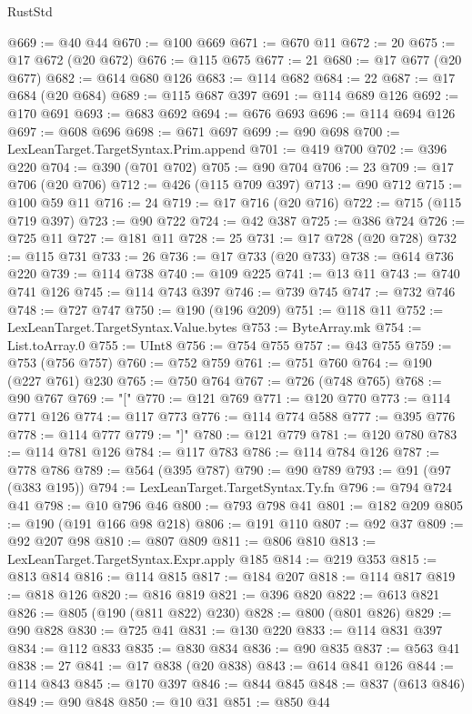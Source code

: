 \begin{lexlean}{RustStd}
\begin{coremodule}
{\begin{coremodule}
{{{{{{{{{{{{{{{{{{{{{{{{{{{{{{{{{{{{{{{{{{{{{{{{{{@669 := @40 @44
@670 := @100 @669
@671 := @670 @11
@672 := 20
@675 := @17 @672 (@20 @672)
@676 := @115 @675
@677 := 21
@680 := @17 @677 (@20 @677)
@682 := @614 @680 @126
@683 := @114 @682
@684 := 22
@687 := @17 @684 (@20 @684)
@689 := @115 @687 @397
@691 := @114 @689 @126
@692 := @170 @691
@693 := @683 @692
@694 := @676 @693
@696 := @114 @694 @126
@697 := @608 @696
@698 := @671 @697
@699 := @90 @698
@700 := LexLeanTarget.TargetSyntax.Prim.append
@701 := @419 @700
@702 := @396 @220
@704 := @390 (@701 @702)
@705 := @90 @704
@706 := 23
@709 := @17 @706 (@20 @706)
@712 := @426 (@115 @709 @397)
@713 := @90 @712
@715 := @100 @59 @11
@716 := 24
@719 := @17 @716 (@20 @716)
@722 := @715 (@115 @719 @397)
@723 := @90 @722
@724 := @42 @387
@725 := @386 @724
@726 := @725 @11
@727 := @181 @11
@728 := 25
@731 := @17 @728 (@20 @728)
@732 := @115 @731
@733 := 26
@736 := @17 @733 (@20 @733)
@738 := @614 @736 @220
@739 := @114 @738
@740 := @109 @225
@741 := @13 @11
@743 := @740 @741 @126
@745 := @114 @743 @397
@746 := @739 @745
@747 := @732 @746
@748 := @727 @747
@750 := @190 (@196 @209)
@751 := @118 @11
@752 := LexLeanTarget.TargetSyntax.Value.bytes
@753 := ByteArray.mk
@754 := List.toArray.{0}
@755 := UInt8
@756 := @754 @755
@757 := @43 @755
@759 := @753 (@756 @757)
@760 := @752 @759
@761 := @751 @760
@764 := @190 (@227 @761) @230
@765 := @750 @764
@767 := @726 (@748 @765)
@768 := @90 @767
@769 := "["
@770 := @121 @769
@771 := @120 @770
@773 := @114 @771 @126
@774 := @117 @773
@776 := @114 @774 @588
@777 := @395 @776
@778 := @114 @777
@779 := "]"
@780 := @121 @779
@781 := @120 @780
@783 := @114 @781 @126
@784 := @117 @783
@786 := @114 @784 @126
@787 := @778 @786
@789 := @564 (@395 @787)
@790 := @90 @789
@793 := @91 (@97 (@383 @195))
@794 := LexLeanTarget.TargetSyntax.Ty.fn
@796 := @794 @724 @41
@798 := @10 @796 @46
@800 := @793 @798 @41
@801 := @182 @209
@805 := @190 (@191 @166 @98 @218)
@806 := @191 @110
@807 := @92 @37
@809 := @92 @207 @98
@810 := @807 @809
@811 := @806 @810
@813 := LexLeanTarget.TargetSyntax.Expr.apply @185
@814 := @219 @353
@815 := @813 @814
@816 := @114 @815
@817 := @184 @207
@818 := @114 @817
@819 := @818 @126
@820 := @816 @819
@821 := @396 @820
@822 := @613 @821
@826 := @805 (@190 (@811 @822) @230)
@828 := @800 (@801 @826)
@829 := @90 @828
@830 := @725 @41
@831 := @130 @220
@833 := @114 @831 @397
@834 := @112 @833
@835 := @830 @834
@836 := @90 @835
@837 := @563 @41
@838 := 27
@841 := @17 @838 (@20 @838)
@843 := @614 @841 @126
@844 := @114 @843
@845 := @170 @397
@846 := @844 @845
@848 := @837 (@613 @846)
@849 := @90 @848
@850 := @10 @31
@851 := @850 @44
}}}}}}}}}}}}}}}}}}}}}}}}}}}}}}}}}}}}}}}}}}}}}}}}}}
\end{coremodule}}
\end{coremodule}
\end{lexlean}
